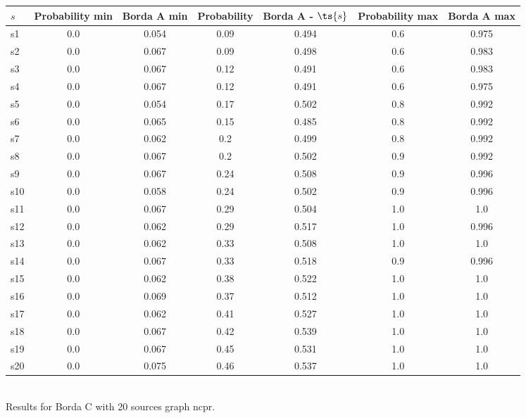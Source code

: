 \documentclass{article}
\begin{document}
\noindent\begin{tabular}{|l|c|c|c|c|c|c|}
\hline
$s$& Probability min & Borda A min & Probability & Borda A - $\ts{s}$ & Probability max & Borda A max\\
\hline
s1 &0.0 & 0.054 & 0.09 & 0.494 & 0.6 & 0.975\\
\hline
s2 &0.0 & 0.067 & 0.09 & 0.498 & 0.6 & 0.983\\
\hline
s3 &0.0 & 0.067 & 0.12 & 0.491 & 0.6 & 0.983\\
\hline
s4 &0.0 & 0.067 & 0.12 & 0.491 & 0.6 & 0.975\\
\hline
s5 &0.0 & 0.054 & 0.17 & 0.502 & 0.8 & 0.992\\
\hline
s6 &0.0 & 0.065 & 0.15 & 0.485 & 0.8 & 0.992\\
\hline
s7 &0.0 & 0.062 & 0.2 & 0.499 & 0.8 & 0.992\\
\hline
s8 &0.0 & 0.067 & 0.2 & 0.502 & 0.9 & 0.992\\
\hline
s9 &0.0 & 0.067 & 0.24 & 0.508 & 0.9 & 0.996\\
\hline
s10 &0.0 & 0.058 & 0.24 & 0.502 & 0.9 & 0.996\\
\hline
s11 &0.0 & 0.067 & 0.29 & 0.504 & 1.0 & 1.0\\
\hline
s12 &0.0 & 0.062 & 0.29 & 0.517 & 1.0 & 0.996\\
\hline
s13 &0.0 & 0.062 & 0.33 & 0.508 & 1.0 & 1.0\\
\hline
s14 &0.0 & 0.067 & 0.33 & 0.518 & 0.9 & 0.996\\
\hline
s15 &0.0 & 0.062 & 0.38 & 0.522 & 1.0 & 1.0\\
\hline
s16 &0.0 & 0.069 & 0.37 & 0.512 & 1.0 & 1.0\\
\hline
s17 &0.0 & 0.062 & 0.41 & 0.527 & 1.0 & 1.0\\
\hline
s18 &0.0 & 0.067 & 0.42 & 0.539 & 1.0 & 1.0\\
\hline
s19 &0.0 & 0.067 & 0.45 & 0.531 & 1.0 & 1.0\\
\hline
s20 &0.0 & 0.075 & 0.46 & 0.537 & 1.0 & 1.0\\
\hline
\end{tabular}\\

\noindent Results for Borda C with 20 sources graph ncpr.
\end{document}
